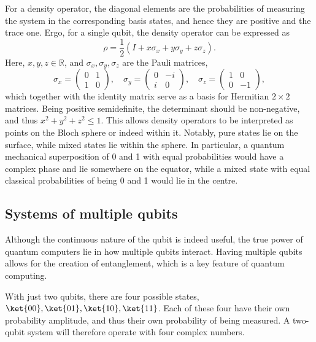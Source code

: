 For a density operator, the diagonal elements are the probabilities of measuring the system in the corresponding basis states, and hence they are positive and the trace one.
Ergo, for a single qubit, the density operator can be expressed as
\begin{equation}
    \rho = \frac{1}{2} \left(I + x \sigma_x + y \sigma_y + z \sigma_z\right).
\end{equation}
Here, $x, y, z \in \mathbb{R}$, and $\sigma_x, \sigma_y, \sigma_z$ are the Pauli matrices,
\begin{equation}
    \sigma_x = \begin{pmatrix} 0 & 1 \\ 1 & 0 \end{pmatrix}, \quad
    \sigma_y = \begin{pmatrix} 0 & -i \\ i & 0 \end{pmatrix}, \quad
    \sigma_z = \begin{pmatrix} 1 & 0 \\ 0 & -1 \end{pmatrix},
    \label{eq:pauli}
\end{equation}
which together with the identity matrix serve as a basis for Hermitian $2\times 2$ matrices.
Being positive semidefinite, the determinant should be non-negative, and thus $x^2 + y^2 + z^2 \leq 1$.
This allows density operators to be interpreted as points on the Bloch sphere or indeed within it.
Notably, pure states lie on the surface, while mixed states lie within the sphere.
In particular, a quantum mechanical superposition of 0 and 1 with equal probabilities would have a complex phase and lie somewhere on the equator, while a mixed state with equal classical probabilities of being 0 and 1 would lie in the centre.

\subsection{Systems of multiple qubits}
Although the continuous nature of the qubit is indeed useful, the true power of quantum computers lie in how multiple qubits interact.
Having multiple qubits allows for the creation of entanglement, which is a key feature of quantum computing.

With just two qubits, there are four possible states, $\ket{00}, \ket{01}, \ket{10}, \ket{11}$.
Each of these four have their own probability amplitude, and thus their own probability of being measured.
A two-qubit system will therefore operate with four complex numbers.

